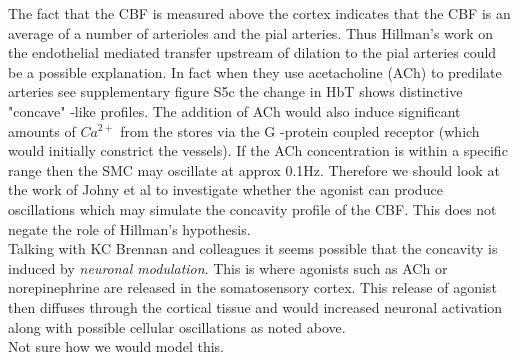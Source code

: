 \documentclass{article}
\newcommand{\commJoey}[1]{{\color{red}{\em Joey: #1}}}
\begin{document}
{The fact that the CBF is measured above the cortex indicates that the CBF is an average of a number of arterioles and the pial arteries. Thus Hillman's work \cite{Chen2014a} on the endothelial mediated transfer upstream of dilation to the pial arteries could be a possible explanation. In fact when they use acetacholine (ACh) to predilate arteries see supplementary figure S5c the change in HbT shows distinctive "concave" -like profiles. The addition of ACh would also induce significant amounts of $Ca^{2+}$ from the stores via the G -protein coupled receptor (which would initially constrict the vessels). If the ACh concentration is within a specific range then the SMC may oscillate at approx 0.1Hz. Therefore we should look at the work of Johny et al \cite{Johny2017} to investigate whether the agonist can produce oscillations which may simulate the concavity profile of the CBF. This does not negate the role of Hillman's hypothesis.\\
Talking with KC Brennan and colleagues it seems possible that the concavity is induced by \textit{neuronal modulation}. This is where agonists such as ACh or norepinephrine are released in the somatosensory cortex. This release of agonist then diffuses through the cortical tissue and would increased neuronal activation along with possible cellular oscillations as noted above. \\
Not sure how we would model this.
}



\end{document}
